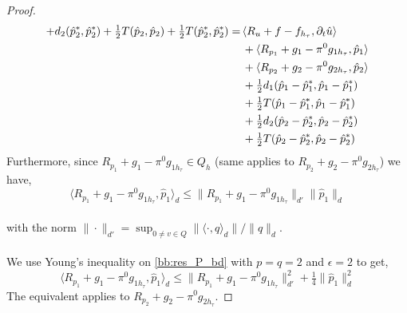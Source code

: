 \begin{proof}
\begin{align}
 + d_2(\hat{p}^*_2, \hat{p}^*_2) + \tfrac{1}{2}T(\hat{p}_2, \hat{p}_2) + \tfrac{1}{2}T(\hat{p}^*_2, \hat{p}^*_2)
= & \, \langle R_u + f - f_{h_\tau}, \partial_t \hat{u} \rangle \notag\\
& \, + \langle R_{p_1} + g_1 - \pi^0g_{1h_\tau}, \hat{p}_1 \rangle \notag \\
& \, + \langle R_{p_2} + g_2 - \pi^0g_{2h_\tau}, \hat{p}_2 \rangle \notag \\
& \, + \tfrac{1}{2} d_1(\hat{p}_1-\hat{p}^*_1, \hat{p}_1-\hat{p}^*_1) \notag\\
& \, + \tfrac{1}{2} T(\hat{p}_1-\hat{p}^*_1, \hat{p}_1-\hat{p}^*_1)\notag \\
& \, + \tfrac{1}{2} d_2(\hat{p}_2-\hat{p}^*_2, \hat{p}_2-\hat{p}^*_2) \notag \\
& \, + \tfrac{1}{2} T(\hat{p}_2-\hat{p}^*_2, \hat{p}_2-\hat{p}^*_2) \notag 
\end{align}
Furthermore, since $R_{p_1} + g_1 - \pi^0g_{1h_\tau} \in Q_h$ (same applies to  $R_{p_2} + g_2 - \pi^0g_{2h_\tau}$) we have,  
\begin{equation} \label{bb:res_P_bd}
\langle R_{p_1} + g_1 - \pi^0g_{1h_\tau}, \hat{p}_1 \rangle_{d} 
 \leq \| R_{p_1} + g_1 - \pi^0g_{1h_\tau} \|_{d'}  \| \hat{p}_1 \|_{d} 
\end{equation}
\\
with the norm  $\|\cdot\|_{d'} = \sup_{0 \neq v \in Q} \|\langle \cdot, q \rangle_{d}\| / \|q\|_{d}$. 
\\
\\
We use Young's inequality on \eqref{bb:res_P_bd} with $p=q=2$ and $\epsilon=2$ to get,
\begin{equation}
\langle R_{p_1} + g_1 - \pi^0g_{1h_\tau}, \hat{p}_1 \rangle_{d} \leq \| R_{p_1} + g_1 - \pi^0g_{1h_\tau} \|^2_{d'} + \tfrac{1}{4} \|\hat{p}_1 \|^2_{d}
\end{equation}
The equivalent applies to $R_{p_2} + g_2 - \pi^0g_{2h_\tau}$. 

\end{proof}
